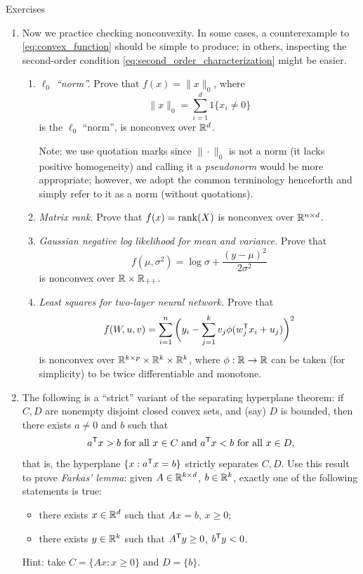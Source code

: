 \begin{xcb}{Exercises}
\begin{enumerate}[label=\thechapter.\arabic*]
\item Now we practice checking nonconvexity. In some cases, a counterexample to
  \eqref{eq:convex_function} should be simple to produce; in others, inspecting
  the second-order condition \eqref{eq:second_order_characterization} might be
  easier.  

\begin{enumerate}[label=\alph*.]
\item \emph{$\ell_0$ ``norm''.}  Prove that $f(x) = \|x\|_0$, where
  \begin{equation}
  \label{eq:l0_norm}
  \|x\|_0 = \sum_{i=1}^d 1\{x_i \not= 0\}
  \end{equation}
  is the $\ell_0$ ``norm'', is nonconvex over $\mathbb{R}^d$.

  \smallskip
  Note: we use quotation marks since $\|\cdot\|_0$ is not a norm (it lacks
  positive homogeneity) and calling it a \emph{pseudonorm} would be more
  appropriate; however, we adopt the common terminology henceforth and simply
  refer to it as a norm (without quotations).   

\item \emph{Matrix rank.} Prove that $f(x) = \operatorname{rank}(X)$ is nonconvex over $\mathbb{R}^{n
    \times d}$.   

\item \emph{Gaussian negative log likelihood for mean and variance.} Prove that  
  \[
  f(\mu, \sigma^2) = \log \sigma + \frac{(y - \mu)^2}{2\sigma^2}
  \]
  is nonconvex over $\mathbb{R} \times \mathbb{R}_{++}$.

\item \emph{Least squares for two-layer neural network.} Prove that 
  \[
  f(W, u, v) = \sum_{i=1}^n \bigg( y_i - \sum_{j=1}^k v_j 
  \phi (w_j^{\mathsf{T}} x_i + u_j) \bigg)^2 
  \]
  is nonconvex over $\mathbb{R}^{k \times p} \times \mathbb{R}^k \times \mathbb{R}^k$, where $\phi : \mathbb{R}
  \to \mathbb{R}$ can be taken (for simplicity) to be twice differentiable and monotone.    
\end{enumerate}

\item \label{ex:farkas} 
  The following is a ``strict'' variant of the separating hyperplane theorem: if 
  $C,D$ are nonempty disjoint closed convex sets, and (say) $D$ is bounded, 
  then there exists $a \not=0 $ and $b$ such that 
  \[
  \text{$a^{\mathsf{T}} x > b$ for all $x \in C$ and $a^{\mathsf{T}} x < b$ for all $x \in D$},
  \]  
  that is, the hyperplane $\{x: a^{\mathsf{T}} x =  b\}$ strictly separates $C,D$. 
  Use this result to prove \emph{Farkas' lemma}: given $A \in \mathbb{R}^{k \times d}$,
  $b \in \mathbb{R}^k$, exactly one of the following statements is true: 
  \begin{itemize}
  \item there exists $x \in \mathbb{R}^d$ such that $Ax=b$, $x \geq 0$;
  \item there exists $y \in \mathbb{R}^k$ such that $A^{\mathsf{T}} y \geq 0$, $b^{\mathsf{T}} y < 0$. 
  \end{itemize}
  Hint: take $C = \{Ax : x \geq 0\}$ and $D = \{b\}$. 


\end{enumerate}
\end{xcb}
